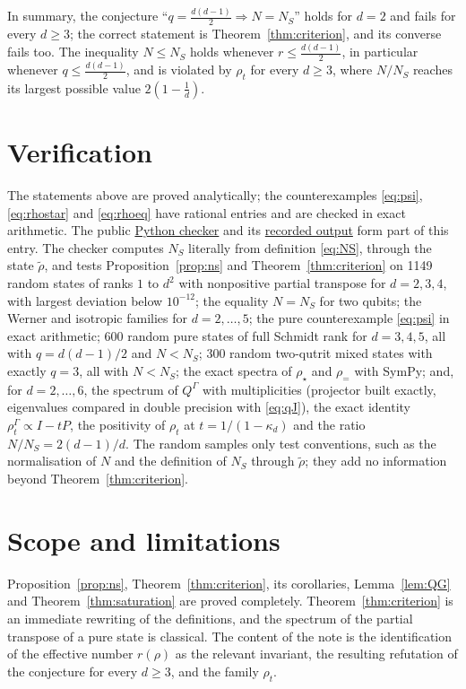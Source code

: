 \documentclass[11pt,a4paper]{article}
\theoremstyle{definition}
\theoremstyle{plain}
\newcommand{\NS}{N_{S}}
\newcommand{\G}{\Gamma}
\begin{document}
In summary, the conjecture ``$q=\frac{d(d-1)}2\Rightarrow N=\NS$'' holds for
$d=2$ and fails for every $d\ge3$; the correct statement is
Theorem~\ref{thm:criterion}, and its converse fails too. The inequality
$N\le\NS$ holds whenever $r\le\frac{d(d-1)}2$, in particular whenever
$q\le\frac{d(d-1)}2$, and is violated by $\rho_t$ for every $d\ge3$, where
$N/\NS$ reaches its largest possible value $2(1-\frac1d)$.

\section{Verification}\label{sec:verification}
The statements above are proved analytically; the counterexamples
\eqref{eq:psi}, \eqref{eq:rhostar} and \eqref{eq:rhoeq} have rational entries
and are checked in exact arithmetic. The public
\href{https://github.com/jpbruneton/open_quantum_problems/blob/main/research/entries/structured-negativity/checks/check_structured_negativity.py}{Python checker}
and its
\href{https://github.com/jpbruneton/open_quantum_problems/blob/main/research/entries/structured-negativity/data/verification.json}{recorded output}
form part of this entry. The checker computes $\NS$ literally from
definition \eqref{eq:NS}, through the state $\tilde\rho$, and tests
Proposition~\ref{prop:ns} and Theorem~\ref{thm:criterion} on 1149 random
states of ranks $1$ to $d^2$ with nonpositive partial transpose for
$d=2,3,4$, with largest deviation below $10^{-12}$; the equality $N=\NS$ for
two qubits; the Werner and isotropic families for $d=2,\dots,5$; the pure
counterexample \eqref{eq:psi} in exact arithmetic; 600 random pure states of
full Schmidt rank for $d=3,4,5$, all with $q=d(d-1)/2$ and $N<\NS$; 300 random
two-qutrit mixed states with exactly $q=3$, all with $N<\NS$; the exact
spectra of $\rho_\star$ and $\rho_=$ with SymPy; and, for $d=2,\dots,6$, the
spectrum of $Q^\G$ with multiplicities (projector built exactly, eigenvalues
compared in double precision with \eqref{eq:qJ}), the exact identity
$\rho_t^\G\propto I-tP$, the positivity of $\rho_t$ at $t=1/(1-\kappa_d)$ and
the ratio $N/\NS=2(d-1)/d$. The random samples only test conventions, such as
the normalisation of $N$ and the definition of $\NS$ through $\tilde\rho$;
they add no information beyond Theorem~\ref{thm:criterion}.

\section{Scope and limitations}\label{sec:scope}
Proposition~\ref{prop:ns}, Theorem~\ref{thm:criterion}, its corollaries,
Lemma~\ref{lem:QG} and Theorem~\ref{thm:saturation} are proved completely.
Theorem~\ref{thm:criterion} is an immediate rewriting of the definitions, and
the spectrum of the partial transpose of a pure state is classical. The
content of the note is the identification of the effective number $r(\rho)$
as the relevant invariant, the resulting refutation of the conjecture for
every $d\ge3$, and the family $\rho_t$.
\end{document}
